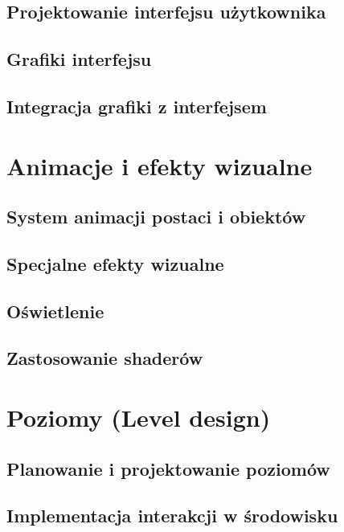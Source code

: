 \documentclass[12pt]{Tech}
\begin{document}
\subsection{Projektowanie interfejsu użytkownika}

\subsection{Grafiki interfejsu}

\subsection{Integracja grafiki z interfejsem}


\newpage

\section{Animacje i efekty wizualne}\label{sec:anim}

\subsection{System animacji postaci i obiektów}

\subsection{Specjalne efekty wizualne}

\subsection{Oświetlenie}

\subsection{Zastosowanie shaderów}


\newpage

\section{Poziomy (Level design)}\label{sec:leveldes}

\subsection{Planowanie i projektowanie poziomów}

\subsection{Implementacja interakcji w środowisku}

\end{document}

